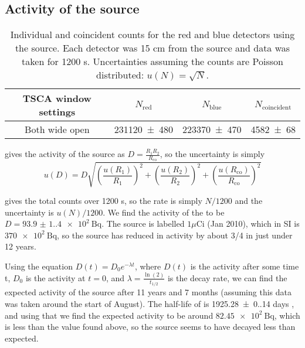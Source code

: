 \documentclass[11pt]{article}
\numberwithin{equation}{section}
\numberwithin{figure}{section}
\numberwithin{table}{section}
\begin{document}
\subsection{Activity of the  source}
\begin{table}[H]
    \centering
    \begin{tabular}{c|c|c|c}
        TSCA window settings & $N_{\text{red}}$ & $N_{\text{blue}}$ & $N_{\text{coincident}}$ \\\hline
        Both wide open & \num{231120(480)} & \num{223370(470)} & \num{4582(68)} 
    \end{tabular}
    \caption{Individual and coincident counts for the red and blue detectors using the  source. Each detector was 15 cm from the source and data was taken for 1200 s. Uncertainties assuming the counts are Poisson distributed: $u(N)=\sqrt{N}$.}
    \label{tbl:activity data}
\end{table}
\par \cite{lab manual} gives the activity of the source as $D=\frac{R_1R_2}{R_{\text{co}}}$, so the uncertainty is simply 
\begin{equation}
    u(D)=D\sqrt{\left(\frac{u(R_1)}{R_1}\right)^2+\left(\frac{u(R_2)}{R_2}\right)^2+\left(\frac{u(R_{\text{co}})}{R_{\text{co}}}\right)^2}
\end{equation}
\par {} gives the total counts over 1200 s, so the rate is simply $N/1200$ and the uncertainty is $u(N)/1200$. We find the activity of the  to be $D=\SI{93.9(1.4)e2}{\becquerel}$. The source is labelled $1\mu$Ci (Jan 2010), which in SI is $\SI{370e2}{\becquerel}$, so the source has reduced in activity by about 3/4 in just under 12 years.
\par Using the equation $D(t)=D_0e^{-\lambda t}$, where $D(t)$ is the activity after some time t, $D_0$ is the activity at $t=0$, and $\lambda=\frac{\ln(2)}{t_{1/2}}$ is the decay rate, we can find the expected activity of the source after 11 years and 7 months (assuming this data was taken around the start of August). The half-life of  is \num{1925.28(0.14)} days \cite{60CoDecay}, and using that we find the expected activity to be around $\SI{82.45e2}{\becquerel}$, which is less than the value found above, so the source seems to have decayed less than expected.
\end{document}
